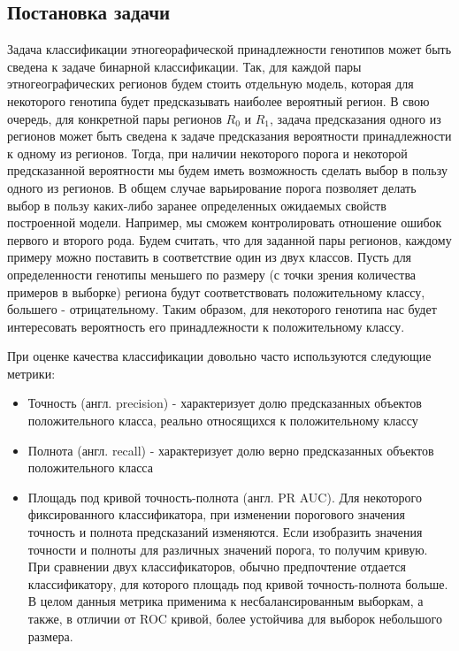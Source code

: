 \subsection{Постановка задачи}

Задача классификации этногеорафической принадлежности генотипов может быть сведена
к задаче бинарной классификации. Так, для каждой пары этногеографических регионов будем
стоить отдельную модель, которая для некоторого генотипа будет предсказывать наиболее вероятный
регион. В свою очередь, для конкретной пары регионов $R_{0}$ и $R_{1}$, задача предсказания
одного из регионов может быть сведена к задаче предсказания вероятности принадлежности к одному
из регионов. Тогда, при наличии некоторого порога и некоторой предсказанной вероятности
мы будем иметь возможность сделать выбор в пользу одного из регионов. В общем случае
варьирование порога позволяет делать выбор в пользу каких-либо заранее определенных
ожидаемых свойств построенной модели. Например, мы сможем контролировать отношение ошибок первого
и второго рода. Будем считать, что для заданной пары регионов, каждому примеру можно поставить в соответствие
один из двух классов. Пусть для определенности генотипы меньшего по размеру (с точки зрения
количества примеров в выборке) региона будут соответствовать положительному классу, большего - отрицательному.
Таким образом, для некоторого генотипа нас будет интересовать вероятность его принадлежности
к положительному классу.

При оценке качества классификации довольно часто используются следующие метрики:

\begin{itemize}
\item Точность (англ. precision) - характеризует долю предсказанных объектов положительного класса,
реально относящихся к положительному классу

\item Полнота (англ. recall) - характеризует долю верно предсказанных объектов положительного класса

\item Площадь под кривой точность-полнота (англ. PR AUC). Для некоторого фиксированного классификатора,
при изменении порогового значения точность и полнота предсказаний изменяются.
Если изобразить значения точности и полноты для различных значений порога, то получим
кривую. При сравнении двух классификаторов, обычно предпочтение отдается классификатору,
для которого площадь под кривой точность-полнота больше. В целом данныя метрика применима
к несбалансированным выборкам, а также, в отличии от ROC кривой, более устойчива для
выборок небольшого размера.
\end{itemize}

